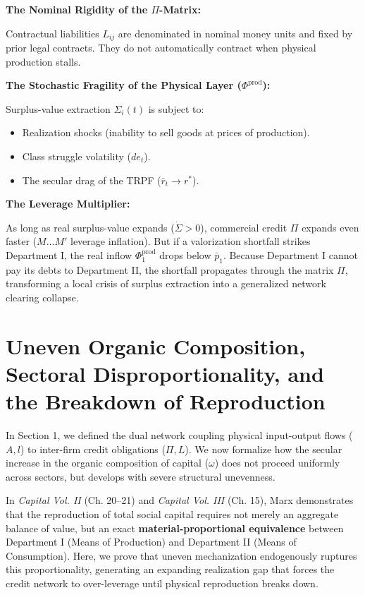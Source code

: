 \documentclass[11pt,letterpaper]{report}
\begin{document}
\textbf{The Nominal Rigidity of the $\Pi$-Matrix:}

Contractual liabilities ${L}_{ij}$ are denominated in nominal money units and fixed by prior legal contracts. They do not automatically contract when physical production stalls.

\textbf{The Stochastic Fragility of the Physical Layer (${\Phi }^{\mathrm{prod}}$):}

Surplus-value extraction ${\Sigma }_{i}(t)$ is subject to:

\begin{itemize}
\item Realization shocks (inability to sell goods at prices of production).
\item Class struggle volatility ($d{e}_{t}$).
\item The secular drag of the TRPF (${\bar{r}}_{t}\rightarrow {r}^{*}$).
\end{itemize}
\textbf{The Leverage Multiplier:}

As long as real surplus-value expands ($\dot{\Sigma }>0$), commercial credit $\Pi$ expands even faster ($M \dots M'$ leverage inflation). But if a valorization shortfall strikes Department I, the real inflow ${\Phi }_{1}^{\mathrm{prod}}$ drops below ${\bar{p}}_{1}$. Because Department I cannot pay its debts to Department II, the shortfall propagates through the matrix $\Pi$, transforming a local crisis of surplus extraction into a generalized network clearing collapse.

\section{Uneven Organic Composition, Sectoral Disproportionality, and the Breakdown of Reproduction}
In Section 1, we defined the dual network coupling physical input-output flows ($A,l$) to inter-firm credit obligations ($\Pi ,L$). We now formalize how the secular increase in the organic composition of capital ($\omega$) does not proceed uniformly across sectors, but develops with severe structural unevenness.

In \emph{Capital Vol. II} (Ch. 20--21) and \emph{Capital Vol. III} (Ch. 15), Marx demonstrates that the reproduction of total social capital requires not merely an aggregate balance of value, but an exact \textbf{material-proportional equivalence} between Department I (Means of Production) and Department II (Means of Consumption). Here, we prove that uneven mechanization endogenously ruptures this proportionality, generating an expanding realization gap that forces the credit network to over-leverage until physical reproduction breaks down.
\end{document}
